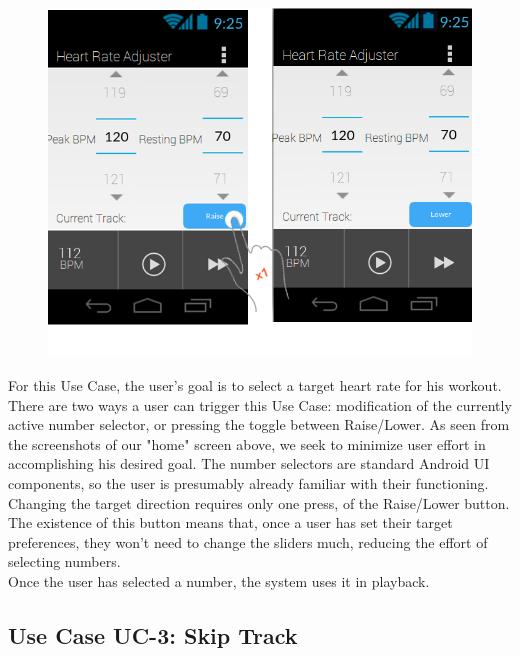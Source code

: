 \documentclass[letterpaper,english, 12pt]{scrreprt}
\begin{document}
\begin{figure}[H]
	\centering
	\includegraphics{img/Prelim_Design/PrelimDesign_1.png}\\
\end{figure}

For this Use Case, the user's goal is to select a target heart rate for his workout.
There are two ways a user can trigger this Use Case: modification of the currently active number selector, or pressing the toggle between Raise/Lower.
As seen from the screenshots of our "home" screen above, we seek to minimize user effort in accomplishing his desired goal.
The number selectors are standard Android UI components, so the user is presumably already familiar with their functioning.
Changing the target direction requires only one press, of the Raise/Lower button.
The existence of this button means that, once a user has set their target preferences, they won't need to change the sliders much, reducing the effort of selecting numbers.\\

Once the user has selected a number, the system uses it in playback.

\subsection{Use Case UC-3: Skip Track}
\end{document}
